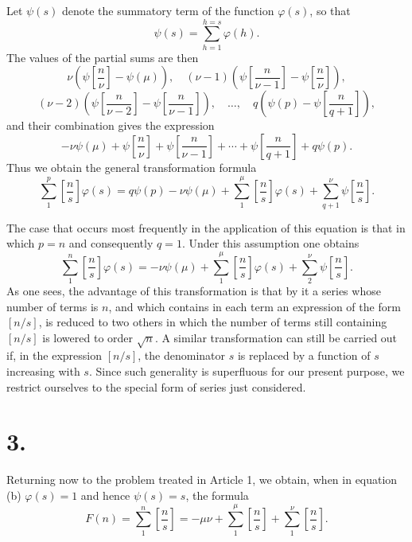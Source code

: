 \documentclass[11pt]{article}
\newcommand{\floor}[1]{\left[#1\right]}
\begin{document}
Let $\psi(s)$ denote the summatory term of the function $\varphi(s)$, so that
\[
 \psi(s)=\sum_{h=1}^{h=s}\varphi(h).
\]
The values of the partial sums are then
\[
 \nu\left(\psi\floor{\frac n\nu}-\psi(\mu)\right),\quad
 (\nu-1)\left(\psi\floor{\frac n{\nu-1}}-\psi\floor{\frac n\nu}\right),
\]
\[
 (\nu-2)\left(\psi\floor{\frac n{\nu-2}}-\psi\floor{\frac n{\nu-1}}\right),\quad\ldots,\quad
 q\left(\psi(p)-\psi\floor{\frac n{q+1}}\right),
\]
and their combination gives the expression
\[
 -\nu\psi(\mu)+\psi\floor{\frac n\nu}+
 \psi\floor{\frac n{\nu-1}}+\cdots+
 \psi\floor{\frac n{q+1}}+q\psi(p).
\]
Thus we obtain the general transformation formula
\begin{equation}
 \sum_{1}^{p}\floor{\frac ns}\varphi(s)=
 q\psi(p)-\nu\psi(\mu)+\sum_{1}^{\mu}\floor{\frac ns}\varphi(s)+
 \sum_{q+1}^{\nu}\psi\floor{\frac ns}. \tag{a}
\end{equation}

The case that occurs most frequently in the application of this equation is that in which $p=n$ and consequently $q=1$. Under this assumption one obtains
\begin{equation}
 \sum_{1}^{n}\floor{\frac ns}\varphi(s)=
 -\nu\psi(\mu)+\sum_{1}^{\mu}\floor{\frac ns}\varphi(s)+
 \sum_{2}^{\nu}\psi\floor{\frac ns}. \tag{b}
\end{equation}
As one sees, the advantage of this transformation is that by it a series whose number of terms is $n$, and which contains in each term an expression of the form $\floor{n/s}$, is reduced to two others in which the number of terms still containing $\floor{n/s}$ is lowered to order $\sqrt n$. A similar transformation can still be carried out if, in the expression $\floor{n/s}$, the denominator $s$ is replaced by a function of $s$ increasing with $s$. Since such generality is superfluous for our present purpose, we restrict ourselves to the special form of series just considered.

\section*{3.}

Returning now to the problem treated in Article 1, we obtain, when in equation (b) $\varphi(s)=1$ and hence $\psi(s)=s$, the formula
\[
 F(n)=\sum_{1}^{n}\floor{\frac ns}=-\mu\nu+
 \sum_{1}^{\mu}\floor{\frac ns}+\sum_{1}^{\nu}\floor{\frac ns}.
\]
\end{document}

